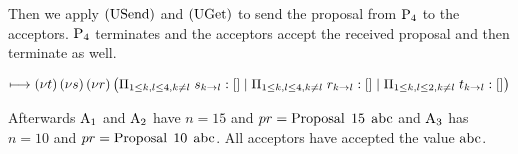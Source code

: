 Then we apply $\Usend$ and $\Uget$ to send the proposal from $\Proposer{4}$ to the acceptors.
$\Proposer{4}$ terminates and the acceptors accept the received proposal and then terminate as well.




$\longmapsto
\NuChannels \big (\InnerSessionQueues{s}
\Or \InnerSessionQueues{r}
\Or \OuterSessionQueues
\big )$

Afterwards $\Acceptor{1}$ and $\Acceptor{2}$ have $n = 15$ and $pr = \ProposalC{15}{\ABC}$ and $\Acceptor{3}$ has $n = 10$ and $pr = \ProposalC{10}{\ABC}$.
All acceptors have accepted the value $\ABC$.



